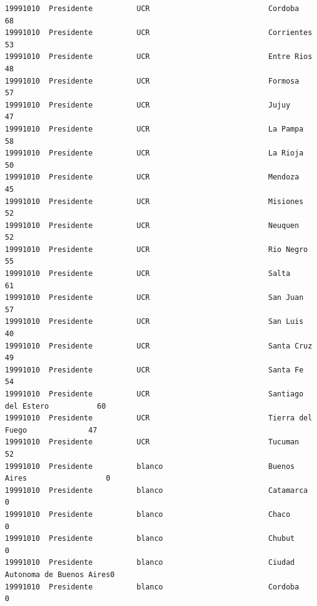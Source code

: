 \documentclass[a4paper,10pt]{article}
\begin{document}
\begin{verbatim}
19991010  Presidente          UCR                           Cordoba                       68             
19991010  Presidente          UCR                           Corrientes                    53             
19991010  Presidente          UCR                           Entre Rios                    48             
19991010  Presidente          UCR                           Formosa                       57             
19991010  Presidente          UCR                           Jujuy                         47             
19991010  Presidente          UCR                           La Pampa                      58             
19991010  Presidente          UCR                           La Rioja                      50             
19991010  Presidente          UCR                           Mendoza                       45             
19991010  Presidente          UCR                           Misiones                      52             
19991010  Presidente          UCR                           Neuquen                       52             
19991010  Presidente          UCR                           Rio Negro                     55             
19991010  Presidente          UCR                           Salta                         61             
19991010  Presidente          UCR                           San Juan                      57             
19991010  Presidente          UCR                           San Luis                      40             
19991010  Presidente          UCR                           Santa Cruz                    49             
19991010  Presidente          UCR                           Santa Fe                      54             
19991010  Presidente          UCR                           Santiago del Estero           60             
19991010  Presidente          UCR                           Tierra del Fuego              47             
19991010  Presidente          UCR                           Tucuman                       52             
19991010  Presidente          blanco                        Buenos Aires                  0              
19991010  Presidente          blanco                        Catamarca                     0              
19991010  Presidente          blanco                        Chaco                         0              
19991010  Presidente          blanco                        Chubut                        0              
19991010  Presidente          blanco                        Ciudad Autonoma de Buenos Aires0              
19991010  Presidente          blanco                        Cordoba                       0              

\end{verbatim}
\end{document}
